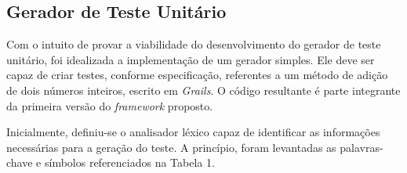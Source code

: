 \subsection{Gerador de Teste Unitário}
Com o intuito de provar a viabilidade do desenvolvimento do gerador de teste unitário, foi idealizada a implementação de um gerador simples. Ele deve ser capaz de criar testes, conforme especificação, referentes a um método de adição de dois números inteiros, escrito em \textit{Grails}. O código resultante é parte integrante da primeira versão do \textit{framework} proposto.
\par 
\indent Inicialmente, definiu-se o analisador léxico capaz de identificar as informações necessárias para a geração do teste. A princípio, foram levantadas as palavras-chave e símbolos referenciados na Tabela 1.

